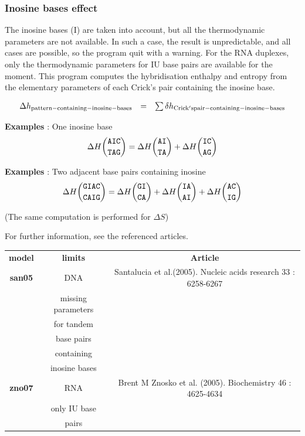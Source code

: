 \documentclass{article}
\begin{document}
\subsubsection{Inosine bases effect}

The inosine bases (I) are taken into account, but all the thermodynamic parameters are not available. 
In such a case, the result is unpredictable, and all cases are possible, so the
program quit with a warning. For the RNA duplexes, only the thermodynamic parameters
for IU base pairs are available for the moment.
This program computes the hybridisation enthalpy and entropy from the elementary 
parameters of each Crick's pair containing the inosine base.

\begin{displaymath}
  \begin{array}[t]{ccc}
  \Delta{}h_\mathrm{pattern-containing-inosine-bases}&=&\sum
  \delta{}h_\mathrm{Crick's pair-containing-inosine-bases}\\
  \end{array}
\end{displaymath}

\textbf{Examples} : One inosine base
\begin{multline*}
\Delta H {\mbox{\texttt{AIC}} \choose \mbox{\texttt{TAG}}} = 
\Delta H {\mbox{\texttt{AI}} \choose \mbox{\texttt{TA}}} +
\Delta H {\mbox{\texttt{IC}} \choose \mbox{\texttt{AG}}}\\
\end{multline*}

\textbf{Examples} : Two adjacent base pairs containing inosine
\begin{multline*}
\Delta H {\mbox{\texttt{GIAC}} \choose \mbox{\texttt{CAIG}}} = 
\Delta H {\mbox{\texttt{GI}} \choose \mbox{\texttt{CA}}} +
\Delta H {\mbox{\texttt{IA}} \choose \mbox{\texttt{AI}}} +
\Delta H {\mbox{\texttt{AC}} \choose \mbox{\texttt{IG}}}\\
\end{multline*}

       (The same computation is performed for $\Delta S$) 
       
For further information, see the referenced articles.

\begin{table}[h]
\begin{tabular}[h]{| c | c | c |}
\textbf{model} & \textbf{limits} & \textbf{Article} \\
\textbf{san05} & DNA & Santalucia et al.(2005). Nucleic acids research 33 : 6258-6267 \\
 & missing parameters & \\
 & for tandem & \\
 & base pairs & \\
 & containing & \\
 & inosine bases & \\
\textbf{zno07} & RNA & Brent M Znosko et al. (2005). Biochemistry 46 : 4625-4634 \\
 & only IU base & \\ 
 & pairs & \\
\end{tabular}
\end{table}
\end{document}
